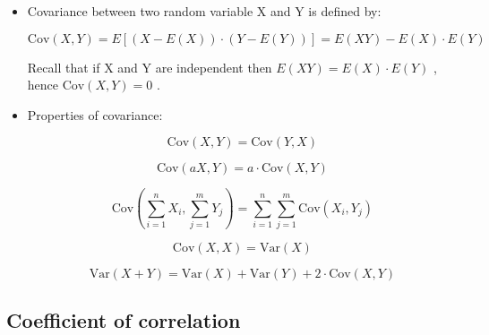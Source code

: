 \documentclass[12pt]{report}
\renewcommand{\_}{\kern-1.5pt\textunderscore\kern-1.5pt}
\begin{document}
\begin{itemize}
	\item Covariance between two random variable X and Y is defined by:\par

 \[ \mathrm{Cov} \left( X,Y \right) =E \left[  \left( X-E \left( X \right)  \right)  \cdot  \left( Y-E \left( Y \right)  \right)  \right] =E \left( XY \right) -E \left( X \right)  \cdot E \left( Y \right)  \] \par

Recall that if X and Y are independent then  \( E \left( XY \right) =E \left( X \right)  \cdot E \left( Y \right)  \) , hence  \( \mathrm{Cov} \left( X,Y \right) =0 \) .\par

	\item Properties of covariance:\par

 \[ \mathrm{Cov} \left( X,Y \right) =\mathrm{Cov} \left( Y,X \right)  \] \par

 \[ \mathrm{Cov} \left( aX,Y \right) =a \cdot \mathrm{Cov} \left( X,Y \right)  \] \par

 \[ \mathrm{Cov} \left(  \sum _{i=1}^{n}X_{i}, \sum _{j=1}^{m}Y_{j} \right) = \sum _{i=1}^{n} \sum _{j=1}^{m}\mathrm{Cov} \left( X_{i},Y_{j} \right)  \] \par

 \[ \mathrm{Cov} \left( X,X \right) =\mathrm{Var} \left( X \right)  \] \par

 \[ \mathrm{Var} \left( X+Y \right) =\mathrm{Var} \left( X \right) +\mathrm{Var} \left( Y \right) +2 \cdot \mathrm{Cov} \left( X,Y \right)  \] \par


\end{itemize}\subsection*{Coefficient of correlation }
\end{document}
